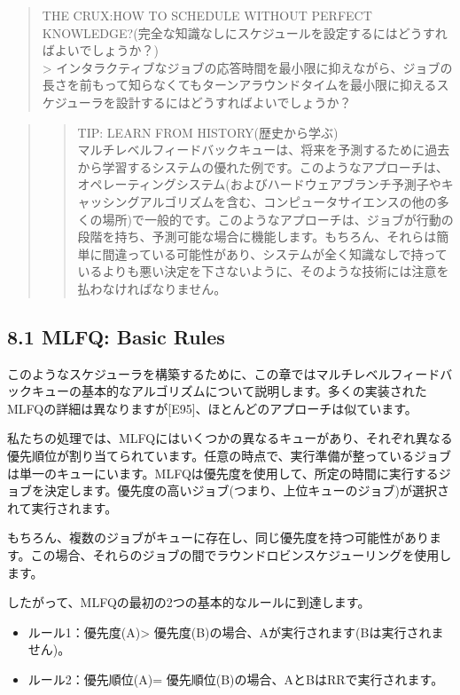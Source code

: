 \begin{quote}
THE CRUX:HOW TO SCHEDULE WITHOUT PERFECT
KNOWLEDGE?(完全な知識なしにスケジュールを設定するにはどうすればよいでしょうか？)\\
\textgreater{}
インタラクティブなジョブの応答時間を最小限に抑えながら、ジョブの長さを前もって知らなくてもターンアラウンドタイムを最小限に抑えるスケジューラを設計するにはどうすればよいでしょうか？
\end{quote}

\begin{quote}
\begin{quote}
TIP: LEARN FROM HISTORY(歴史から学ぶ)\\
マルチレベルフィードバックキューは、将来を予測するために過去から学習するシステムの優れた例です。このようなアプローチは、オペレーティングシステム(およびハードウェアブランチ予測子やキャッシングアルゴリズムを含む、コンピュータサイエンスの他の多くの場所)で一般的です。このようなアプローチは、ジョブが行動の段階を持ち、予測可能な場合に機能します。もちろん、それらは簡単に間違っている可能性があり、システムが全く知識なしで持っているよりも悪い決定を下さないように、そのような技術には注意を払わなければなりません。
\end{quote}
\end{quote}

\hypertarget{mlfq-basic-rules}{%
\subsection*{8.1 MLFQ: Basic Rules}\label{mlfq-basic-rules}}

このようなスケジューラを構築するために、この章ではマルチレベルフィードバックキューの基本的なアルゴリズムについて説明します。多くの実装されたMLFQの詳細は異なりますが{[}E95{]}、ほとんどのアプローチは似ています。

私たちの処理では、MLFQにはいくつかの異なるキューがあり、それぞれ異なる優先順位が割り当てられています。任意の時点で、実行準備が整っているジョブは単一のキューにいます。MLFQは優先度を使用して、所定の時間に実行するジョブを決定します。優先度の高いジョブ(つまり、上位キューのジョブ)が選択されて実行されます。

もちろん、複数のジョブがキューに存在し、同じ優先度を持つ可能性があります。この場合、それらのジョブの間でラウンドロビンスケジューリングを使用します。

したがって、MLFQの最初の2つの基本的なルールに到達します。

\begin{itemize}
\tightlist
\item
  ルール1：優先度(A)\textgreater{}
  優先度(B)の場合、Aが実行されます(Bは実行されません)。
\item
  ルール2：優先順位(A)= 優先順位(B)の場合、AとBはRRで実行されます。
\end{itemize}

